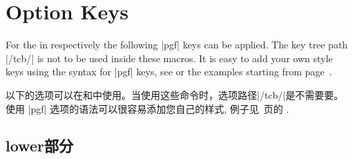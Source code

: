 \section{Option Keys}\label{sec:optkeys}%
%
For the  in  respectively 
the following |pgf| keys can be applied. The key tree path |/tcb/| is not to
be used inside these macros. It is easy to add your own style keys using
the syntax for |pgf| keys, see \cite{tantau:tikz_and_pgf,sturm:latex} or the examples
starting from page~\pageref{sec:latextutorial}.

以下的选项可以在和中使用。当使用这些命令时，选项路径|/tcb/|是不需要要。
使用 |pgf| 选项的语法可以很容易添加您自己的样式, 例子见~\pageref{sec:latextutorial}页的 \cite{tantau:tikz_and_pgf,sturm:latex} .


% 
% 
% 
  

\subsection{lower部分}


  


